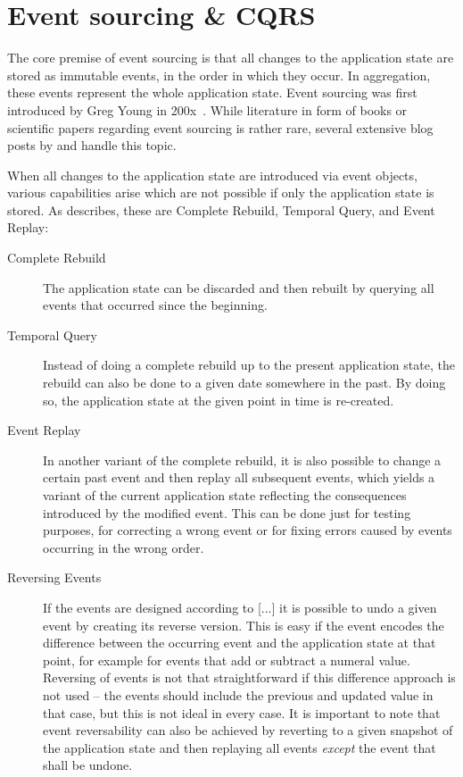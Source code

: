 \section{Event sourcing \& CQRS}
\label{sec:fundamentals:event}

The core premise of event sourcing is that all changes to the application state are stored as immutable events, in the order in which they occur.
In aggregation, these events represent the whole application state.
Event sourcing was first introduced by Greg Young in 200x~\cite{???}.
While literature in form of books or scientific papers regarding event sourcing is rather rare, several extensive blog posts by \citet{WEB:Fowler:2005} and \citet{Todo:WEB:Young:200x} handle this topic.

When all changes to the application state are introduced via event objects, various capabilities arise which are not possible if only the application state is stored.
As \citet{WEB:Fowler:2005} describes, these are Complete Rebuild, Temporal Query, and Event Replay:

\begin{description}
\item [Complete Rebuild]
The application state can be discarded and then rebuilt by querying all events that occurred since the beginning.
\item [Temporal Query]
Instead of doing a complete rebuild up to the present application state, the rebuild can also be done to a given date somewhere in the past.
By doing so, the application state at the given point in time is re-created.
\item [Event Replay]
In another variant of the complete rebuild, it is also possible to change a certain past event and then replay all subsequent events, which yields a variant of the current application state reflecting the consequences introduced by the modified event.
This can be done just for testing purposes, for correcting a wrong event or for fixing errors caused by events occurring in the wrong order.
\item [Reversing Events]
If the events are designed according to [...] it is possible to undo a given event by creating its reverse version.
This is easy if the event encodes the difference between the occurring event and the application state at that point, for example for events that add or subtract a numeral value.
Reversing of events is not that straightforward if this difference approach is not used -- the events should include the previous and updated value in that case, but this is not ideal in every case.
It is important to note that event reversability can also be achieved by reverting to a given snapshot of the application state and then replaying all events \emph{except} the event that shall be undone.
\end{description}

